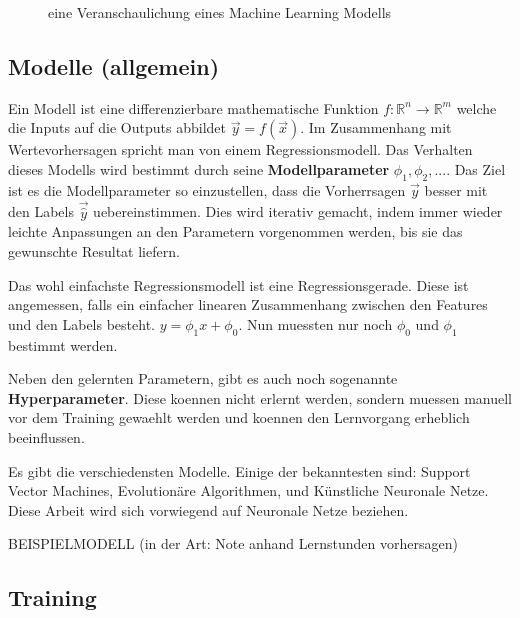 \documentclass[../main]{subfiles}
\begin{document}
\begin{figure}[h!]
    \centering
    \begin{tikzpicture}[node distance=5cm,auto]
        
    \end{tikzpicture}
    
    \caption{eine Veranschaulichung eines Machine Learning Modells}
\end{figure}

\subsection{Modelle (allgemein)}
Ein Modell ist eine differenzierbare mathematische Funktion $\mathit{f}\colon \mathbb{R}^n \to \mathbb{R}^m$ welche die Inputs auf die Outputs abbildet $\vec{y}=\mathit{f}(\vec{x})$.
Im Zusammenhang mit Wertevorhersagen spricht man von einem Regressionsmodell.
Das Verhalten dieses Modells wird bestimmt durch seine \textbf{Modellparameter} $\phi_1, \phi_2, ...$.
Das Ziel ist es die Modellparameter so einzustellen, dass die Vorherrsagen $\vec{y}$ besser mit den Labels $\vec{\hat{y}}$ uebereinstimmen.
Dies wird iterativ gemacht, indem immer wieder leichte Anpassungen an den Parametern vorgenommen werden, bis sie das gewunschte Resultat liefern. 

Das wohl einfachste Regressionsmodell ist eine Regressionsgerade. Diese ist angemessen, falls ein einfacher linearen Zusammenhang zwischen den Features und den Labels besteht.
$y=\phi_1x + \phi_0$. Nun muessten nur noch $\phi_0$ und $\phi_1$ bestimmt werden. 

Neben den gelernten Parametern, gibt es auch noch sogenannte \textbf{Hyperparameter}.
Diese koennen nicht erlernt werden, sondern muessen manuell vor dem Training gewaehlt werden und koennen den Lernvorgang erheblich beeinflussen.
\par
\medskip
Es gibt die verschiedensten Modelle. Einige der bekanntesten sind: Support Vector Machines, Evolutionäre Algorithmen, und Künstliche Neuronale Netze.
Diese Arbeit wird sich vorwiegend auf Neuronale Netze beziehen.

BEISPIELMODELL (in der Art: Note anhand Lernstunden vorhersagen)

\subsection{Training}
\end{document}
